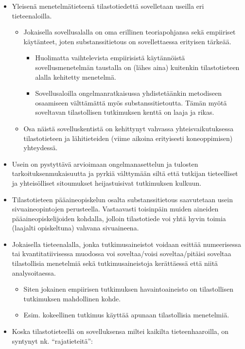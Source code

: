 \documentclass[
]{book}
\providecommand{\tightlist}{%
  \setlength{\itemsep}{0pt}\setlength{\parskip}{0pt}}
\begin{document}
\begin{itemize}
\item
  Yleisenä menetelmätieteenä tilastotiedettä sovelletaan useilla eri tieteenaloilla.

  \begin{itemize}
  \tightlist
  \item
    Jokaisella sovellusalalla on oma erillinen teoriapohjansa sekä empiiriset käytänteet, joten substanssitietous on sovellettaessa erityisen tärkeää.

    \begin{itemize}
    \tightlist
    \item
      Huolimatta vaihtelevista empiirisistä käytännöistä sovellusmenetelmän taustalla on (lähes aina) kuitenkin tilastotieteen alalla kehitetty menetelmä.
    \item
      Sovellusaloilla ongelmanratkaisussa yhdistetäänkin metodiseen osaamiseen välttämättä myös substanssitietoutta. Tämän myötä soveltavan tilastollisen tutkimuksen kenttä on laaja ja rikas.
    \end{itemize}
  \item
    Osa näistä sovelluskentistä on kehittynyt vahvassa yhteisvaikutuksessa tilastotieteen ja lähitieteiden (viime aikoina erityisesti koneoppimisen) yhteydessä.
  \end{itemize}
\item
  Usein on pystyttävä arvioimaan ongelmanasettelun ja tulosten tarkoituksenmukaisuutta ja pyrkiä välttymään siltä että tutkijan tieteelliset ja yhteisölliset sitoumukset heijastuisivat tutkimuksen kulkuun.
\item
  Tilastotieteen pääaineopiskelun osalta substanssitietous saavutetaan usein sivuaineopintojen perusteella. Vastaavasti toisinpäin muiden aineiden pääaineopiskelijoiden kohdalla, jolloin tilastotiede voi yhtä hyvin toimia (laajalti opiskeltuna) vahvana sivuaineena.
\item
  Jokaisella tieteenalalla, jonka tutkimusaineistot voidaan esittää numeerisessa tai kvantitatiivisessa muodossa voi soveltaa/voisi soveltaa/pitäisi soveltaa tilastollisia menetelmiä sekä tutkimusaineistoja kerättäessä että niitä analysoitaessa.

  \begin{itemize}
  \tightlist
  \item
    Siten jokainen empiirisen tutkimuksen havaintoaineisto on tilastollisen tutkimuksen mahdollinen kohde.
  \item
    Esim. kokeellinen tutkimus käyttää apunaan tilastollisia menetelmiä.
  \end{itemize}
\item
  Koska tilastotieteellä on sovelluksensa miltei kaikilta tieteenhaaroilla, on syntynyt nk. ``rajatieteitä'':


\end{itemize}
\end{document}
